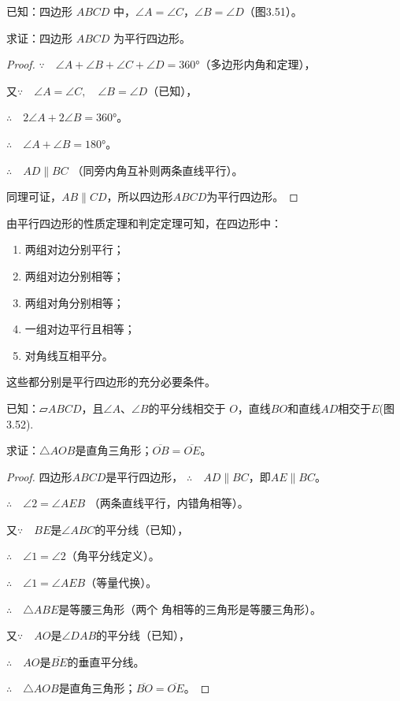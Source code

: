 已知：四边形 $ABCD$ 中，$\angle A=\angle C$，$\angle B=\angle D$（图3.51）。

求证：四边形 $ABCD$ 为平行四边形。

\begin{proof}
$\because\quad \angle A+\angle B+\angle C +\angle D=3\ang{60}$（多边形内角和定理），

又$\because\quad \angle A=\angle C,\quad\angle B=\angle D$（已知），

$\therefore\quad 2\angle A+2\angle B=3\ang{60}$。

$\therefore\quad \angle A+\angle B=\ang{180}$。

$\therefore\quad AD\parallel BC$ （同旁内角互补则两条直线平行）。

同理可证，$AB\parallel CD$，所以四边形$ABCD$为平行四边形。
\end{proof}

由平行四边形的性质定理和判定定理可知，在四边形中：
\begin{enumerate}
    \item 两组对边分别平行；
    \item 两组对边分别相等；
    \item 两组对角分别相等；
    \item 一组对边平行且相等；
    \item 对角线互相平分。
\end{enumerate}
这些都分别是平行四边形的充分必要条件。

\begin{example}
     已知：$\parallelogram ABCD$，且$\angle A$、$\angle B$的平分线相交于
$O$，直线$BO$和直线$AD$相交于$E$(图3.52).

求证：$\triangle AOB$是直角三角形；$\overline{OB}=\overline{OE}$。
\end{example}

\begin{proof}
四边形$ABCD$是平行四边形，
$\therefore\quad AD\parallel BC$，即$AE\parallel BC$。

$\therefore\quad \angle 2=\angle AEB$ （两条直线平行，内错角相等）。

又$\because\quad BE$是$\angle ABC$的平分线（已知），

$\therefore\quad \angle 1=\angle 2$（角平分线定义）。

$\therefore\quad \angle 1=\angle AEB$（等量代换）。

$\therefore\quad \triangle ABE$是等腰三角形（两个
角相等的三角形是等腰三角形）。

又$\because\quad AO$是$\angle DAB$的平分线（已知），

$\therefore\quad AO$是$\overline{BE}$的垂直平分线。

$\therefore\quad \triangle AOB$是直角三角形；$\overline{BO}=\overline{OE}$。
\end{proof}

